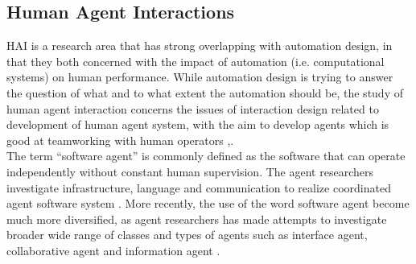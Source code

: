 
\subsection{Human Agent Interactions}\label{sec:LRHAI}
\acf{HAI} is a research area that has strong overlapping with automation design, in that they both concerned with the impact of automation (i.e. computational systems) on human performance. While automation design is trying to answer the question of what and to what extent the automation should be, the study of human agent interaction concerns the issues of interaction design related to development of human agent system, with the aim to develop agents which is good at teamworking with human operators \cite{Bradshaw2011},\cite{Sukthankara}. \\

The term ``software agent'' is commonly defined as the software that can operate independently without constant human supervision\cite{Vlassis2007}. The agent researchers investigate infrastructure, language and communication to realize coordinated agent software system \cite{Nwana1996}. More recently, the use of the word software agent become much more diversified, as agent researchers has made attempts to investigate broader wide range of classes and types of agents such as interface agent, collaborative agent and information agent \cite{Nwana1996}.  \\

